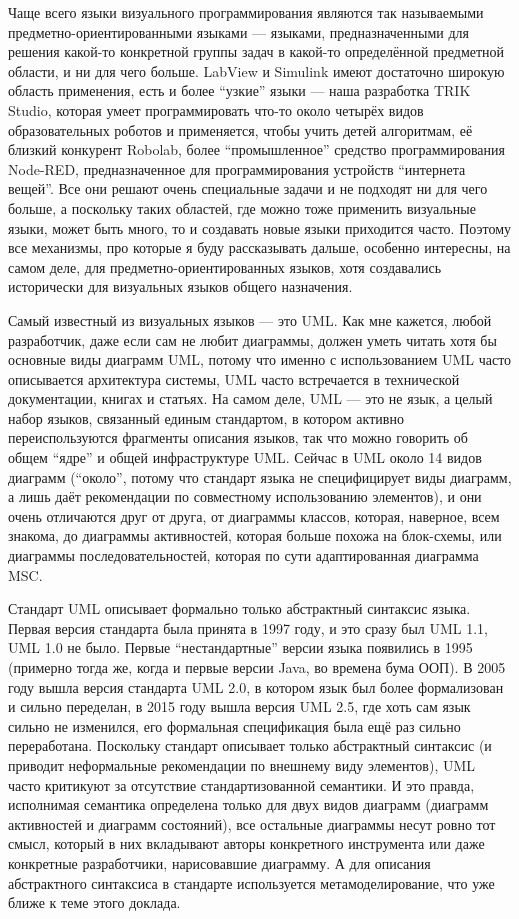 \documentclass[a5paper]{article}
\begin{document}
Чаще всего языки визуального программирования являются так называемыми предметно-ориентированными языками --- языками, предназначенными для решения какой-то конкретной группы задач в какой-то определённой предметной области, и ни для чего больше. LabView и Simulink имеют достаточно широкую область применения, есть и более ``узкие'' языки --- наша разработка TRIK Studio, которая умеет программировать что-то около четырёх видов образовательных роботов и применяется, чтобы учить детей алгоритмам, её близкий конкурент Robolab, более ``промышленное'' средство программирования Node-RED, предназначенное для программирования устройств ``интернета вещей''. Все они решают очень специальные задачи и не подходят ни для чего больше, а поскольку таких областей, где можно тоже применить визуальные языки, может быть много, то и создавать новые языки приходится часто. Поэтому все механизмы, про которые я буду рассказывать дальше, особенно интересны, на самом деле, для предметно-ориентированных языков, хотя создавались исторически для визуальных языков общего назначения.

Самый известный из визуальных языков --- это UML. Как мне кажется, любой разработчик, даже если сам не любит диаграммы, должен уметь читать хотя бы основные виды диаграмм UML, потому что именно с использованием UML часто описывается архитектура системы, UML часто встречается в технической документации, книгах и статьях. На самом деле, UML --- это не язык, а целый набор языков, связанный единым стандартом, в котором активно переиспользуются фрагменты описания языков, так что можно говорить об общем ``ядре'' и общей инфраструктуре UML. Сейчас в UML около 14 видов диаграмм (``около'', потому что стандарт языка не специфицирует виды диаграмм, а лишь даёт рекомендации по совместному использованию элементов), и они очень отличаются друг от друга, от диаграммы классов, которая, наверное, всем знакома, до диаграммы активностей, которая больше похожа на блок-схемы, или диаграммы последовательностей, которая по сути адаптированная диаграмма MSC.

Стандарт UML описывает формально только абстрактный синтаксис языка. Первая версия стандарта была принята в 1997 году, и это сразу был UML 1.1, UML 1.0 не было. Первые ``нестандартные'' версии языка появились в 1995 (примерно тогда же, когда и первые версии Java, во времена бума ООП). В 2005 году вышла версия стандарта UML 2.0, в котором язык был более формализован и сильно переделан, в 2015 году вышла версия UML 2.5, где хоть сам язык сильно не изменился, его формальная спецификация была ещё раз сильно переработана. Поскольку стандарт описывает только абстрактный синтаксис (и приводит неформальные рекомендации по внешнему виду элементов), UML часто критикуют за отсутствие стандартизованной семантики. И это правда, исполнимая семантика определена только для двух видов диаграмм (диаграмм активностей и диаграмм состояний), все остальные диаграммы несут ровно тот смысл, который в них вкладывают авторы конкретного инструмента или даже конкретные разработчики, нарисовавшие диаграмму. А для описания абстрактного синтаксиса в стандарте используется метамоделирование, что уже ближе к теме этого доклада.
\end{document}
